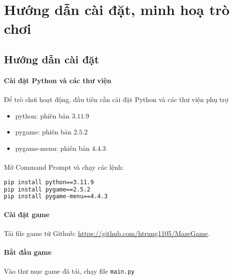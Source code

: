 \newpage
\section{Hướng dẫn cài đặt, minh hoạ trò chơi}

\subsection{Hướng dẫn cài đặt}

\paragraph{Cài đặt Python và các thư viện}
\paragraph{}{Để trò chơi hoạt động, đầu tiên cần cài đặt Python và các thư viện phụ trợ}
\begin{itemize}
    \item python: phiên bản $3.11.9$
    \item pygame: phiên bản $2.5.2$
    \item pygame-menu: phiên bản $4.4.3$
\end{itemize}

\paragraph{}{Mở Command Prompt và chạy các lệnh:}
\begin{lstlisting}[language=tex]
pip install python==3.11.9
pip install pygame==2.5.2
pip install pygame-menu==4.4.3
\end{lstlisting}

\paragraph{Cài đặt game}
\paragraph{}{Tải file game từ Github: \href{https://github.com/htrung1105/MazeGame}{https://github.com/htrung1105/MazeGame}}.

\paragraph{Bắt đầu game}
\paragraph{}{Vào thư mục game đã tải, chạy file \texttt{main.py}}


